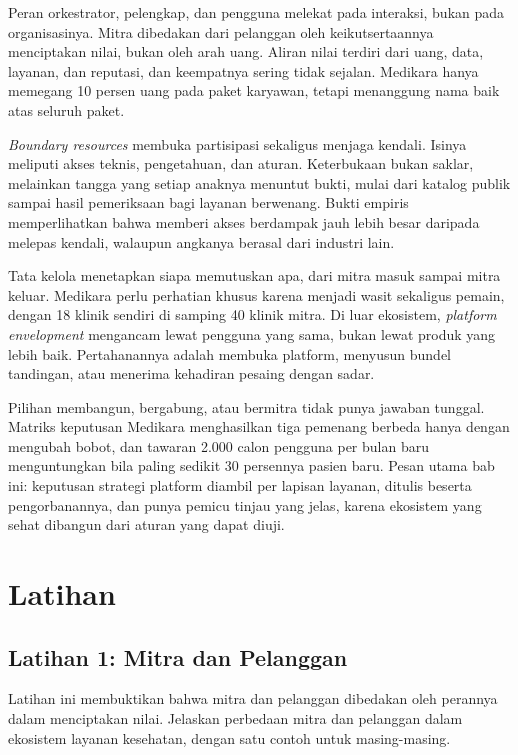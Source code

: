 Peran orkestrator, pelengkap, dan pengguna melekat pada interaksi, bukan pada organisasinya. Mitra dibedakan dari
pelanggan oleh keikutsertaannya menciptakan nilai, bukan oleh arah uang. Aliran nilai terdiri dari uang, data,
layanan, dan reputasi, dan keempatnya sering tidak sejalan. Medikara hanya memegang 10 persen uang pada paket
karyawan, tetapi menanggung nama baik atas seluruh paket.

\textit{Boundary resources} membuka partisipasi sekaligus menjaga kendali. Isinya meliputi akses teknis,
pengetahuan, dan aturan. Keterbukaan bukan saklar, melainkan tangga yang setiap anaknya menuntut bukti, mulai dari
katalog publik sampai hasil pemeriksaan bagi layanan berwenang. Bukti empiris memperlihatkan bahwa memberi akses
berdampak jauh lebih besar daripada melepas kendali, walaupun angkanya berasal dari industri lain.

Tata kelola menetapkan siapa memutuskan apa, dari mitra masuk sampai mitra keluar. Medikara perlu perhatian khusus
karena menjadi wasit sekaligus pemain, dengan 18 klinik sendiri di samping 40 klinik mitra. Di luar ekosistem,
\textit{platform envelopment} mengancam lewat pengguna yang sama, bukan lewat produk yang lebih baik. Pertahanannya
adalah membuka platform, menyusun bundel tandingan, atau menerima kehadiran pesaing dengan sadar.

Pilihan membangun, bergabung, atau bermitra tidak punya jawaban tunggal. Matriks keputusan Medikara menghasilkan
tiga pemenang berbeda hanya dengan mengubah bobot, dan tawaran 2.000 calon pengguna per bulan baru menguntungkan bila
paling sedikit 30 persennya pasien baru. Pesan utama bab ini: keputusan strategi platform diambil per lapisan
layanan, ditulis beserta pengorbanannya, dan punya pemicu tinjau yang jelas, karena ekosistem yang sehat dibangun
dari aturan yang dapat diuji.

\section{Latihan}

\subsection*{Latihan 1: Mitra dan Pelanggan}

Latihan ini membuktikan bahwa mitra dan pelanggan dibedakan oleh perannya dalam menciptakan nilai. Jelaskan
perbedaan mitra dan pelanggan dalam ekosistem layanan kesehatan, dengan satu contoh untuk masing-masing.

